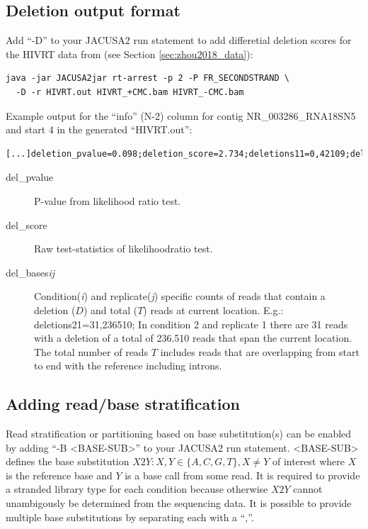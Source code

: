 \documentclass[10pt,a4paper,final]{article}
\begin{document}
\subsection{Deletion output format}
Add ``-D'' to your JACUSA2 run statement to add differetial deletion scores for the HIVRT data from 
\cite{Zhou2018} (see Section \ref{sec:zhou2018_data}):
\begin{verbatim}
java -jar JACUSA2jar rt-arrest -p 2 -P FR_SECONDSTRAND \
  -D -r HIVRT.out HIVRT_+CMC.bam HIVRT_-CMC.bam
\end{verbatim}
Example output for the ``info'' (N-2) column for contig NR\_003286\_RNA18SN5 and start 4 in the 
generated ``HIVRT.out'':
\begin{verbatim}
[...]deletion_pvalue=0.098;deletion_score=2.734;deletions11=0,42109;deletions21=8,89123[...]
\end{verbatim}
\begin{description}
  \item[del\_pvalue] P-value from likelihood ratio test.
  \item[del\_score] Raw test-statistics of likelihoodratio test.
  \item[del\_bases\textit{ij}] Condition(\textit{i}) and replicate(\textit{j}) specific counts 
  of reads that contain a deletion ($D$) and total ($T$) reads at current location. E.g.: deletions21=31,236510;
  In condition 2 and replicate 1 there are 31 reads with a deletion of a total of 236.510 reads 
  that span the current location. The total number of reads $T$ includes reads that are overlapping 
  from start to end with the reference including introns.
\end{description}
\subsection{Adding read/base stratification}\label{sec:read_base_stratification}
Read stratification or partitioning based on base substitution(s) can be enabled by adding ``-B <BASE-SUB>'' 
to your JACUSA2 run statement. <BASE-SUB> defines the base substitution $X2Y : X,Y \in\{A, C, G, T\}, X \ne Y$ 
of interest where $X$ is the reference base and $Y$ is a base call from some read. It is required to provide 
a stranded library type for each condition because otherwise $X2Y$ cannot unambigously be determined from the 
sequencing data. It is possible to provide multiple base substitutions by separating each with a ``,''.
\end{document}
